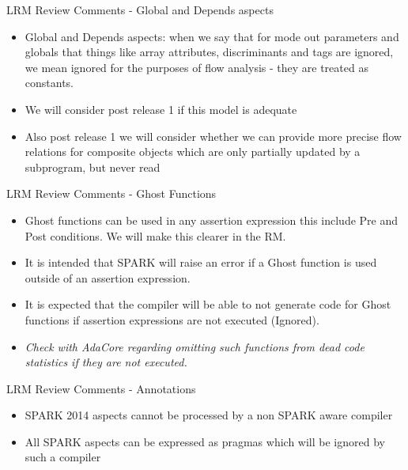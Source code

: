 \documentclass{beamer}
\begin{document}
\begin{frame}{LRM Review Comments - Global and Depends aspects}

  \begin{itemize}

  \item Global and Depends aspects: when we say that for mode out
    parameters and globals that things like array attributes,
    discriminants and tags are ignored, we mean ignored for the
    purposes of  flow analysis - they are treated as constants.  
  \item We will consider post release 1 if this model is adequate
  \item Also post release 1 we will consider whether we can provide more
  precise flow relations for composite objects which are only
  partially updated by a subprogram, but never read
  \end{itemize}

\end{frame}

\begin{frame}{LRM Review Comments - Ghost Functions}

  \begin{itemize}

  \item Ghost functions can be used in any assertion expression this
    include Pre and Post conditions.  We will make this clearer in the
    RM.
  \item It is intended that SPARK will raise an error if a Ghost
    function is used outside of an assertion expression.  
  \item It is expected that the compiler will be able to not generate
    code for Ghost functions if assertion expressions are not executed
    (Ignored).
  \item \emph {Check with AdaCore regarding omitting such functions
    from dead code statistics if they are not executed.}
 \end{itemize}

\end{frame}

\begin{frame}{LRM Review Comments - Annotations}

  \begin{itemize}

  \item SPARK 2014 aspects cannot be processed by a non SPARK aware compiler  
  \item All SPARK aspects can be expressed as pragmas which will be
    ignored by such a compiler
 \end{itemize}

\end{frame}
\end{document}
